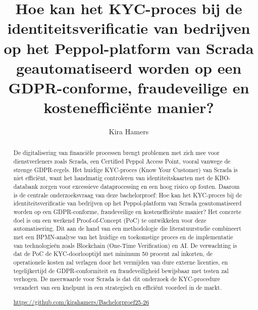 \documentclass{hogent-article}
\title{Hoe kan het KYC-proces bij de identiteitsverificatie van bedrijven op het Peppol-platform van Scrada geautomatiseerd worden op een GDPR-conforme, fraudeveilige en kostenefficiënte manier?}
\author{Kira Hamers}
\begin{document}
\begin{abstract}
  De digitalisering van financiële processen brengt problemen met zich mee voor dienstverleners zoals Scrada, een Certified Peppol Access Point, vooral vanwege de strenge GDPR-regels. 
  Het huidige KYC-proces (Know Your Customer) van Scrada is niet efficiënt, want het handmatig controleren van identiteitskaarten met de KBO-databank zorgen voor excessieve dataprocessing en een hoog risico op fouten. 
  Daarom is de centrale onderzoeksvraag van deze bachelorproef: Hoe kan het KYC-proces bij de identiteitsverificatie van bedrijven op het Peppol-platform van Scrada geautomatiseerd worden op een GDPR-conforme, fraudeveilige en kostenefficiënte manier? 
  Het concrete doel is om een werkend Proof-of-Concept (PoC) te ontwikkelen voor deze automatisering. 
  Dit aan de hand van een methodologie die literatuurstudie combineert met een BPMN-analyse van het huidige en toekomstige proces 
  en de implementatie van technologieën zoals Blockchain (One-Time Verification) en AI. 
  De verwachting is dat de PoC de KYC-doorlooptijd met minimum 50 procent zal inkorten, de operationele kosten zal verlagen door het vermijden van dure externe licenties, 
  en tegelijkertijd de GDPR-conformiteit en fraudeveiligheid bewijsbaar met testen zal verhogen. De meerwaarde voor Scrada is dat dit onderzoek de KYC-procedure verandert van een knelpunt in een 
  strategisch en efficiënt voordeel in de markt.

  \url{https://github.com/kirahamers/Bachelorproef25-26}
\end{abstract}

\tableofcontents



\printbibliography[heading=bibintoc]
\end{document}

